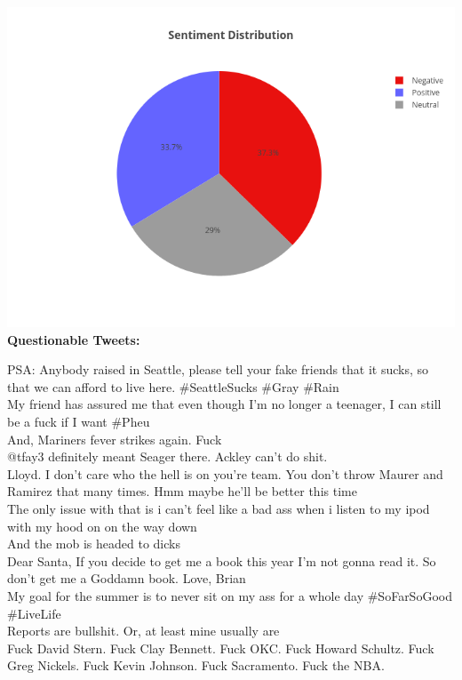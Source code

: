 \documentclass[12pt]{article}
\begin{document}
\begin{center}
\begin{center}
\bigbreak
\includegraphics[width=0.8 \textwidth]{sentiment_pie_chart.png}\\
\newpage
\noindent \large \textbf{Questionable Tweets:}\\
\end{center}
\smallbreak PSA: Anybody raised in Seattle, please tell your fake friends that it sucks, so that we can afford to live here. \#SeattleSucks \#Gray \#Rain\\
\smallbreak My friend has assured me that even though I'm no longer a teenager, I can still be a fuck if I want \#Pheu\\
\smallbreak And, Mariners fever strikes again. Fuck\\
\smallbreak @tfay3 definitely meant Seager there. Ackley can't do shit.\\
\smallbreak Lloyd. I don't care who the hell is on you're team. You don't throw Maurer and Ramirez that many times. Hmm maybe he'll be better this time\\
\smallbreak The only issue with that is i can't feel like a bad ass when i listen to my ipod with my hood on on the way down\\
\smallbreak And the mob is headed to dicks\\
\smallbreak Dear Santa,
If you decide to get me a book this year I'm not gonna read it. So don't get me a Goddamn book.
Love, Brian\\
\smallbreak My goal for the summer is to never sit on my ass for a whole day \#SoFarSoGood \#LiveLife\\
\smallbreak Reports are bullshit. Or, at least mine usually are\\
\smallbreak Fuck David Stern. Fuck Clay Bennett. Fuck OKC. Fuck Howard Schultz. Fuck Greg Nickels. Fuck Kevin Johnson. Fuck Sacramento. Fuck the NBA.\\

\end{center}
\end{document}
